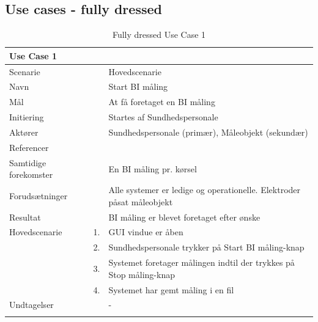 \documentclass[main.tex]{subfiles}
\begin{document}
\subsection{Use cases - fully dressed}

\begin{longtabu} to  %
	{\large \textbf{Use Case 1}} && \\
	\toprule
	Scenarie 				&&	Hovedscenarie\\
	Navn 					&& 	Start BI måling\\
	Mål 					&& 	At få foretaget en BI måling\\
	Initiering 				&& 	Startes af Sundhedspersonale\\
	Aktører 				&& 	Sundhedspersonale (primær), Måleobjekt (sekundær)\\
	Referencer 				&& 	\\
	Samtidige forekomster  	&& 	En BI måling pr. kørsel \\
	Forudsætninger 			&&	Alle systemer er ledige og operationelle. Elektroder påsat måleobjekt\\ 
	Resultat 				&& 	BI måling er blevet foretaget efter ønske\\ \midrule
	Hovedscenarie 			&    1. 	&	GUI vindue er åben\\				 	
							&    2. 	& 	Sundhedspersonale trykker på Start BI måling-knap\\ 
							& 	 3.		&	 Systemet foretager målingen indtil der trykkes på Stop måling-knap \\[-1ex]
                            & 	 4.		&	 Systemet har gemt måling i en fil \\[-1ex]
	Undtagelser 			&			& 	-  \\ \bottomrule
	
	\caption{Fully dressed Use Case 1}
	\label{UC1}
\end{longtabu}
\end{document}
